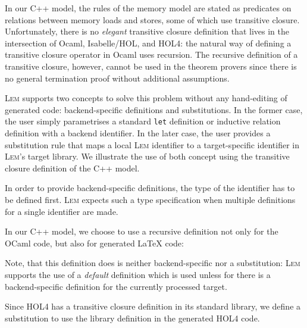 \documentclass[a4paper]{llncs}
\newcommand{\Lem}{\textsc{Lem}}
\begin{document}
In our C++ model, the rules of the memory model are stated as predicates on
relations between memory loads and stores, some of which use transitive
closure. Unfortunately, there is no \emph{elegant} transitive closure
definition that lives in the intersection of Ocaml, Isabelle/HOL, and HOL4: the
natural way of defining a transitive closure operator in Ocaml uses recursion.
The recursive definition of a transitive closure, however, cannot be used in
the theorem provers since there is no general termination proof without
additional assumptions.

\Lem{} supports two concepts to solve this problem without any hand-editing of
generated code: backend-specific definitions and substitutions. In the former
case, the user simply parametrises a standard \verb|let| definition or inductive
relation definition with a backend identifier. In the later case, the user
provides a substitution rule that maps a local \Lem{} identifier to a
target-specific identifier in \Lem's target library. We illustrate the use of
both concept using the transitive closure definition of the C++ model. 

In order to provide backend-specific definitions, the type of the identifier has
to be defined first. \Lem{} expects such a type specification when multiple
definitions for a single identifier are made.

\par{}

\noindent In our C++ model, we choose to use a recursive definition not only for
the OCaml code, but also for generated \LaTeX{} code:

\par{}

\noindent Note, that this definition does is neither backend-specific nor a substitution:
\Lem{} supports the use of a \emph{default} definition which is used unless for
there is a backend-specific definition for the currently processed target.

Since HOL4 has a transitive closure definition in its standard library, we
define a substitution to use the library definition in the generated HOL4 code.
\end{document}
